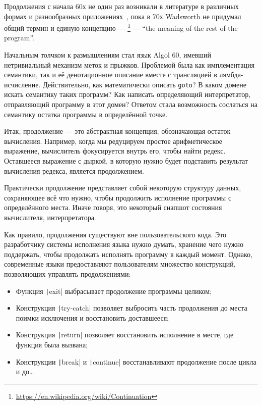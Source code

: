 
Продолжения с начала 60х не один раз возникали в литературе в различных формах и разнообразных приложениях~\cite{reynolds1993discoveries, landin1997histories}, пока в 70х Wadsworth не придумал общий термин и единую концепцию --- \footnote{\url{https://en.wikipedia.org/wiki/Continuation}} --- ``the meaning of the rest of the program''.

Начальным толчком к размышлениям стал язык Algol 60, имевший нетривиальный механизм меток и прыжков.
Проблемой была как имплементация семантики, так и её денотационное описание вместе с трансляцией в лямбда-исчисление.
Действительно, как математически описать \texttt{goto}?
В каком домене искать семантику таких программ?
Как написать определяющий интерпретатор, отправляющий программу в этот домен?
Ответом стала возможность сослаться на семантику остатка программы в определённой точке.

Итак, продолжение --- это абстрактная концепция, обозначающая остаток вычисления.
Например, когда мы редуцируем простое арифметическое выражение, вычислитель фокусируется внутрь его, чтобы найти редекс.
Оставшееся выражение с дыркой, в которую нужно будет подставить результат вычисления редекса, является продолжением.


Практически продолжение представляет собой некоторую структуру данных, сохраняющее всё что нужно, чтобы продолжить исполнение программы с определённого места.
Иначе говоря, это некоторый снапшот состояния вычислителя, интерпретатора.

Как правило, продолжения существуют вне пользовательского кода.
Это разработчику системы исполнения языка нужно думать, хранение чего нужно поддержать, чтобы продолжать исполнять программу в каждый момент.
Однако, современные языки предоставляют пользователям множество конструкций, позволяющих управлять продолжениями:

\begin{itemize}
    \item Функция \texttt|exit| выбрасывает продолжение программы целиком;
    \item Конструкция \texttt|try-catch| позволяет выбросить часть продолжения до места поимки исключения и восстановить доставшееся;
    \item Конструкция \texttt|return| позволяет восстановить исполнение в месте, где функция была вызвана;
    \item Конструкции \texttt|break| и \texttt|continue| восстанавливают продолжение после цикла и до\ldots
\end{itemize}

